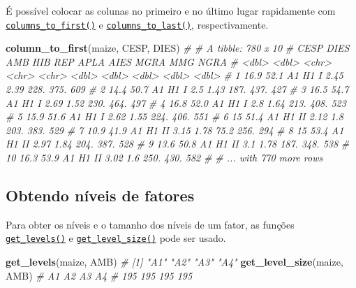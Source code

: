\documentclass[
]{book}
\newenvironment{Shaded}{\begin{snugshade}}{\end{snugshade}}
\newcommand{\CommentTok}[1]{\textcolor[rgb]{0.56,0.35,0.01}{\textit{#1}}}
\newcommand{\KeywordTok}[1]{\textcolor[rgb]{0.13,0.29,0.53}{\textbf{#1}}}
\newcommand{\NormalTok}[1]{#1}
\begin{document}
É possível colocar as colunas no primeiro e no último lugar rapidamente com \href{https://tiagoolivoto.github.io/metan/reference/utils_rows_cols.html}{\texttt{columns\_to\_first()}} e \href{https:\%20//tiagoolivoto.github.io/metan/reference/utils_rows_cols.html}{\texttt{columns\_to\_last()}}, respectivamente.

\begin{Shaded}
\begin{Highlighting}[]
\KeywordTok{column_to_first}\NormalTok{(maize, CESP, DIES)}
\CommentTok{# # A tibble: 780 x 10}
\CommentTok{#     CESP  DIES AMB   HIB   REP    APLA  AIES  MGRA   MMG  NGRA}
\CommentTok{#    <dbl> <dbl> <chr> <chr> <chr> <dbl> <dbl> <dbl> <dbl> <dbl>}
\CommentTok{#  1  16.9  52.1 A1    H1    I      2.45  2.39 228.   375.   609}
\CommentTok{#  2  14.4  50.7 A1    H1    I      2.5   1.43 187.   437.   427}
\CommentTok{#  3  16.5  54.7 A1    H1    I      2.69  1.52 230.   464.   497}
\CommentTok{#  4  16.8  52.0 A1    H1    I      2.8   1.64 213.   408.   523}
\CommentTok{#  5  15.9  51.6 A1    H1    I      2.62  1.55 224.   406.   551}
\CommentTok{#  6  15    51.4 A1    H1    II     2.12  1.8  203.   383.   529}
\CommentTok{#  7  10.9  41.9 A1    H1    II     3.15  1.78  75.2  256.   294}
\CommentTok{#  8  15    53.4 A1    H1    II     2.97  1.84 204.   387.   528}
\CommentTok{#  9  13.6  50.8 A1    H1    II     3.1   1.78 187.   348.   538}
\CommentTok{# 10  16.3  53.9 A1    H1    II     3.02  1.6  250.   430.   582}
\CommentTok{# # ... with 770 more rows}
\end{Highlighting}
\end{Shaded}

\hypertarget{obtendo-nuxedveis-de-fatores}{%
\subsection{Obtendo níveis de fatores}\label{obtendo-nuxedveis-de-fatores}}

Para obter os níveis e o tamanho dos níveis de um fator, as funções \href{https://tiagoolivoto.github.io/metan/reference/utils_rows_cols.html}{\texttt{get\_levels()}} e \href{https://tiagoolivoto.github.io/metan/reference/utils_rows_cols.html}{\texttt{get\_level\_size()}} pode ser usado.

\begin{Shaded}
\begin{Highlighting}[]
\KeywordTok{get_levels}\NormalTok{(maize, AMB)}
\CommentTok{# [1] "A1" "A2" "A3" "A4"}
\KeywordTok{get_level_size}\NormalTok{(maize, AMB)}
\CommentTok{#  A1  A2  A3  A4 }
\CommentTok{# 195 195 195 195}
\end{Highlighting}
\end{Shaded}
\end{document}
